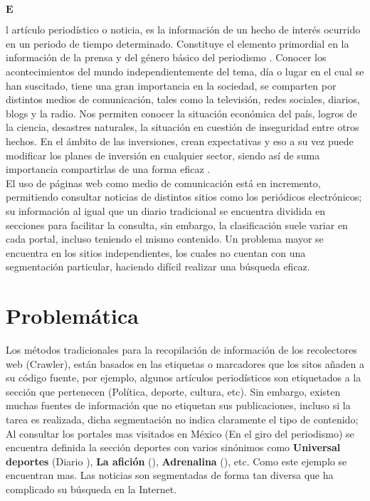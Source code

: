 	








\ \\\\
\begin{Large}$\mathbf{E}$\end{Large}l artículo periodístico o noticia, es la información de un hecho de interés ocurrido en un periodo de tiempo determinado. Constituye el elemento primordial en la información de la prensa y del género básico del periodismo \cite{uno}. Conocer los acontecimientos del mundo independientemente del tema, día o lugar en el cual se han suscitado, tiene una gran importancia en la sociedad, se comparten por distintos medios de comunicación, tales como la televisión, redes sociales, diarios, blogs y la radio. Nos permiten conocer la situación económica del país, logros de la ciencia, desastres naturales, la situación en cuestión de inseguridad entre otros hechos. En el ámbito de las inversiones, crean expectativas y eso a su vez puede modificar los planes de inversión en cualquier sector, siendo así de suma importancia compartirlas de una forma eficaz \cite{dos}.\\

El uso de páginas web como medio de comunicación está en incremento, permitiendo consultar noticias de distintos sitios como los periódicos electrónicos; su información al igual que un diario tradicional se encuentra dividida en secciones para facilitar la consulta, sin embargo, la clasificación suele variar en cada portal, incluso teniendo el mismo contenido. Un problema mayor se encuentra en los sitios independientes, los cuales no cuentan con una segmentación particular, haciendo difícil realizar una búsqueda eficaz.\\



\section{Problemática}


Los métodos tradicionales para la recopilación de información de los recolectores web (Crawler), están basados en las etiquetas o marcadores que los sitos añaden a su código fuente, por ejemplo, algunos artículos periodísticos son etiquetados a la sección que pertenecen (Política, deporte, cultura, etc). Sin embargo, existen muchas fuentes de información que no etiquetan sus publicaciones, incluso si la tarea es realizada, dicha segmentación no indica claramente el tipo de contenido; Al consultar los portales mas visitados en México (En el giro del periodismo) se encuentra definida la sección deportes con varios sinónimos como \textbf{Universal deportes} (Diario ), \textbf{La afición} (), \textbf{Adrenalina} (), etc. Como este ejemplo se encuentran mas. Las noticias son segmentadas de forma tan diversa que ha complicado su búsqueda en la Internet.\\


